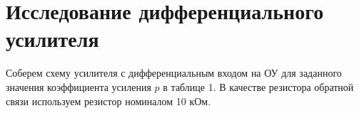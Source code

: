 \documentclass[a4paper, 12pt]{article}
\begin{document}
    \section{Исследование дифференциального усилителя}
    Соберем схему усилителя с дифференциальным входом на ОУ
    для заданного значения коэффициента усиления $p$ в таблице 1.
    В качестве резистора обратной связи используем резистор номиналом 10 кОм.
\end{document}
